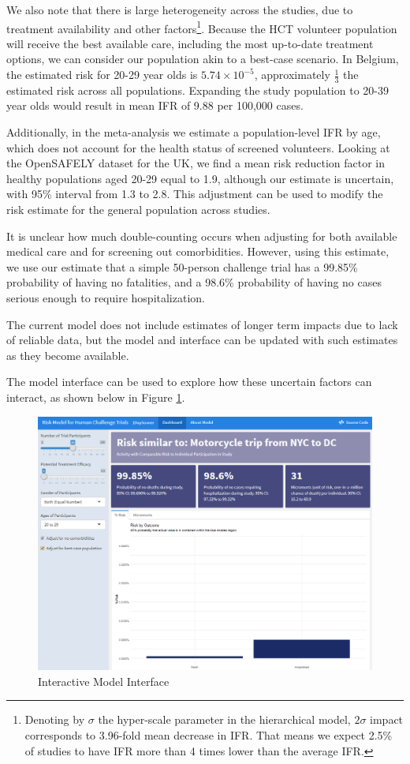 \documentclass{article}
\begin{document}
We also note that there is large heterogeneity across the studies, due to treatment availability and other factors\footnote{Denoting by $\sigma$ the hyper-scale parameter in the hierarchical model, $2\sigma$ impact corresponds to 3.96-fold mean decrease in IFR. That means we expect 2.5\% of studies to have IFR more than 4 times lower than the average IFR.}. Because the HCT volunteer population will receive the best available care, including the most up-to-date treatment options, we can consider our population akin to a best-case scenario. In Belgium, the estimated risk for 20-29 year olds is $5.74 \times 10^{-5}$, approximately $\frac{1}{3}$ the estimated risk across all populations. Expanding the study population to 20-39 year olds would result in mean IFR of 9.88 per 100,000 cases.

Additionally, in the meta-analysis we estimate a population-level IFR by age, which does not account for the health status of screened volunteers. Looking at the OpenSAFELY dataset for the UK, we find a mean risk reduction factor in healthy populations aged 20-29 equal to 1.9, although our estimate is uncertain, with 95\% interval from 1.3 to 2.8. This adjustment can be used to modify the risk estimate for the general population across studies.

It is unclear how much double-counting occurs when adjusting for both available medical care and for screening out comorbidities. However, using this estimate, we use our estimate that a simple 50-person challenge trial has a  99.85\% probability of having no fatalities, and a 98.6\% probability of having no cases serious enough to require hospitalization.

The current model does not include estimates of longer term impacts due to lack of reliable data, but the model and interface can be updated with such estimates as they become available.

The model interface can be used to explore how these uncertain factors can interact, as shown below in Figure \ref{fig:webinterface}.
\begin{figure}
    \centering
    \includegraphics[scale=0.33]{RiskModelInterface.png}
    \caption{Interactive Model Interface}
    \label{fig:webinterface}
\end{figure}
\end{document}
